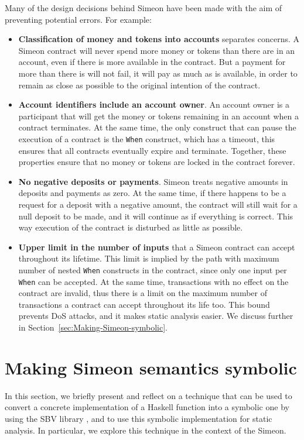 \documentclass[english,runningheads]{llncs}
\begin{document}
Many of the design decisions behind Simeon have been made with the
aim of preventing potential errors. For example:
\begin{itemize}
\item \textbf{Classification of money and tokens into accounts} separates concerns.
A Simeon contract will never spend more money or tokens than there are in an
account, even if there is more available in the contract. But a payment
for more than there is will not fail, it will pay as much as
is available, in order to remain as close as possible
to the original intention of the contract.
\item \textbf{Account identifiers include an account owner}. An account owner
is a participant that will get the money or tokens remaining in an account
when a contract terminates. At the same time, the only construct that
can pause the execution of a contract is the \texttt{When} construct,
which has a timeout, this ensures that all contracts eventually expire
and terminate. Together, these properties ensure that no money or tokens
are locked in the contract forever.
\item \textbf{No negative deposits or payments}. Simeon treats negative
amounts in deposits and payments as zero. At the same time,
if there happens to be a request for a deposit with a negative amount,
the contract will still wait for a null deposit to
be made, and it will continue as if everything is correct. This way execution
of the contract is disturbed as little as possible.
\item \textbf{Upper limit in the number of inputs} that a Simeon contract
can accept throughout its lifetime. This limit is implied by the path with
maximum number of nested \texttt{When} constructs in the contract, since only
one input per \texttt{When} can be accepted. At the same time, transactions
with no effect on the contract are invalid, thus there is
a limit on the maximum number of transactions a contract can accept
throughout its life too. This bound prevents DoS attacks, and it makes static analysis
easier. We discuss further in Section~\ref{sec:Making-Simeon-symbolic}.
\end{itemize}

\section{Making Simeon semantics symbolic\label{sec:Making-Simeon-symbolic}}

In this section, we briefly present and reflect on a technique that
can be used to convert a concrete implementation of a Haskell function
into a symbolic one by using the SBV library \cite{erkok2019sbv}, and to use this symbolic
implementation for static analysis. In particular, we explore this
technique in the context of the Simeon.
\end{document}
